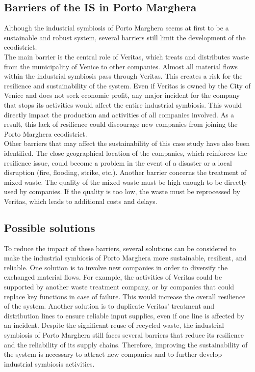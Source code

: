 \subsection{Barriers of the IS in Porto Marghera}
Although the industrial symbiosis of Porto Marghera seems at first to be a sustainable and robust system, several barriers still limit the development of the ecodistrict.\\

\noindent The main barrier is the central role of Veritas, which treats and distributes waste from the municipality of Venice to other companies. Almost all material flows within the industrial symbiosis pass through Veritas. This creates a risk for the resilience and sustainability of the system. Even if Veritas is owned by the City of Venice and does not seek economic profit, any major incident for the company that stops its activities would affect the entire industrial symbiosis. This would directly impact the production and activities of all companies involved. As a result, this lack of resilience could discourage new companies from joining the Porto Marghera ecodistrict.\\

\noindent Other barriers that may affect the sustainability of this case study have also been identified. The close geographical location of the companies, which reinforces the resilience issue, could become a problem in the event of a disaster or a local disruption (fire, flooding, strike, etc.). Another barrier concerns the treatment of mixed waste. The quality of the mixed waste must be high enough to be directly used by companies. If the quality is too low, the waste must be reprocessed by Veritas, which leads to additional costs and delays.\\
\subsection{Possible solutions}
To reduce the impact of these barriers, several solutions can be considered to make the industrial symbiosis of Porto Marghera more sustainable, resilient, and reliable. One solution is to involve new companies in order to diversify the exchanged material flows. For example, the activities of Veritas could be supported by another waste treatment company, or by companies that could replace key functions in case of failure. This would increase the overall resilience of the system. Another solution is to duplicate Veritas’ treatment and distribution lines to ensure reliable input supplies, even if one line is affected by an incident.
Despite the significant reuse of recycled waste, the industrial symbiosis of Porto Marghera still faces several barriers that reduce its resilience and the reliability of its supply chains. Therefore, improving the sustainability of the system is necessary to attract new companies and to further develop industrial symbiosis activities.